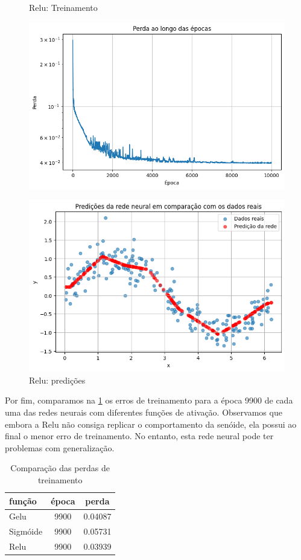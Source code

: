 \begin{figure}[htb]
	\centering
	\begin{minipage}{0.45\textwidth}
	\centering
	\caption{Relu: Treinamento} \label{tarefa01:relu:treinamento}
	\includegraphics[width=\textwidth]{./0803_imgs/png-241110-145116395-16963719957492600077.png}
	\end{minipage}
	\hfill
	\begin{minipage}{0.45\textwidth}
	\centering
	\caption{Relu: predições} \label{tarefa01:relu:predicoes}
	\includegraphics[width=\textwidth]{./0803_imgs/png-241111-212509484-7783840008639668300.png}
	\end{minipage}
\end{figure}

Por fim, comparamos na \cref{tarefa01:tab:funcoes} os erros de treinamento para 
a época 9900 de cada uma das redes neurais com diferentes funções de ativação. 
Observamos que embora a Relu não consiga replicar o comportamento da senóide, 
ela possui ao final o menor erro de treinamento. No entanto, esta rede neural 
pode ter problemas com generalização.

\begin{table}[htb]
	\centering
	\caption{Comparação das perdas de treinamento}
	\label{tarefa01:tab:funcoes}
	\begin{tabular}{ l | c | c }
		função & época & perda \\
		\hline
		Gelu & 9900 &  0.04087 \\
		Sigmóide & 9900 & 0.05731 \\
		Relu & 9900 & 0.03939 \\
	\end{tabular}
\end{table}
